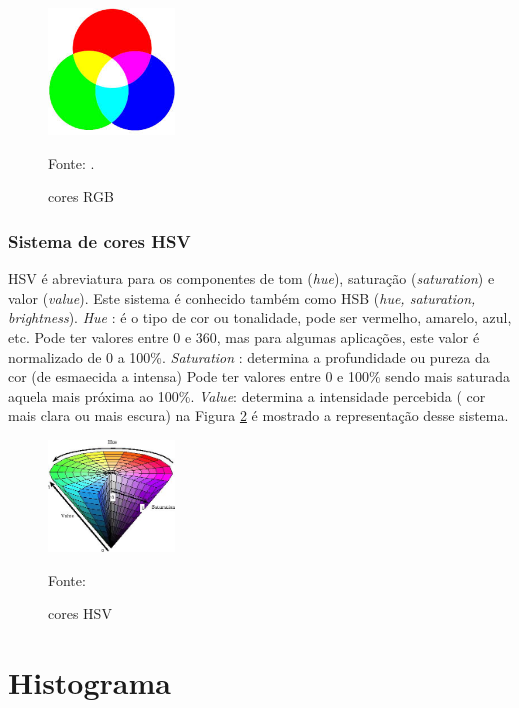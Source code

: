 \begin{figure}[H]
 \centering
 \includegraphics[width=0.30\textwidth]{./fig/fundamentacao/cores-rgb}
 \caption{cores RGB}
 Fonte: \cite{coresRGB}.
 \label{fig:imgCORES}
\end{figure}

\subsubsection{Sistema de cores HSV}
\label{subsub:siscores-HSV}


HSV é abreviatura para os componentes de tom (\textit{hue}), saturação (\textit{saturation}) e valor (\textit{value}). Este sistema é conhecido também como HSB (\textit{hue, saturation, brightness}). 
\textit{Hue} :  é o tipo de cor ou tonalidade, pode ser vermelho, amarelo, azul, etc. Pode ter valores entre 0 e 360, mas para algumas aplicações, este valor é normalizado de 0 a 100\%.
\textit{Saturation} : determina a profundidade ou pureza da cor (de esmaecida a intensa) Pode ter valores entre 0 e 100\% sendo mais saturada aquela mais próxima ao 100\%.
\textit{Value}: determina a intensidade percebida ( cor mais clara ou mais escura)
na Figura \ref{fig:imgHSV} é mostrado a representação desse sistema.

\begin{figure}[H]
 \centering
 \includegraphics[width=0.30\textwidth]{./fig/fundamentacao/hsvcone}
 \caption{cores HSV}
 Fonte: \cite{coresHSV}
 \label{fig:imgHSV}
\end{figure}

\section{Histograma}
\label{sec:histograma}

